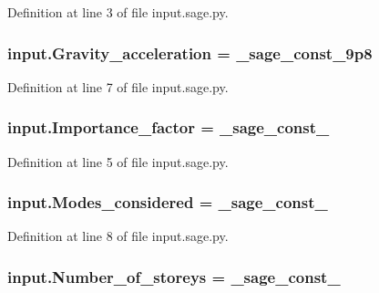Definition at line 3 of file input.\+sage.\+py.

\hypertarget{a00038_a55ab15c1c171513e99332aa50c723764}{}
\subsubsection[{Gravity\+\_\+acceleration}]{\setlength{\rightskip}{0pt plus 5cm}input.\+Gravity\+\_\+acceleration = {\bf \+\_\+sage\+\_\+const\+\_\+9p8}}\label{a00038_a55ab15c1c171513e99332aa50c723764}


Definition at line 7 of file input.\+sage.\+py.

\hypertarget{a00038_a0840d963ea24db338f3ab4457defb494}{}
\subsubsection[{Importance\+\_\+factor}]{\setlength{\rightskip}{0pt plus 5cm}input.\+Importance\+\_\+factor = \+\_\+sage\+\_\+const\+\_}\label{a00038_a0840d963ea24db338f3ab4457defb494}


Definition at line 5 of file input.\+sage.\+py.

\hypertarget{a00038_adb7aca4735796aaa4a46456d3edeac2e}{}
\subsubsection[{Modes\+\_\+considered}]{\setlength{\rightskip}{0pt plus 5cm}input.\+Modes\+\_\+considered = \+\_\+sage\+\_\+const\+\_}\label{a00038_adb7aca4735796aaa4a46456d3edeac2e}


Definition at line 8 of file input.\+sage.\+py.

\hypertarget{a00038_a10237b312ba44e8c8090db86059c5803}{}
\subsubsection[{Number\+\_\+of\+\_\+storeys}]{\setlength{\rightskip}{0pt plus 5cm}input.\+Number\+\_\+of\+\_\+storeys = \+\_\+sage\+\_\+const\+\_}\label{a00038_a10237b312ba44e8c8090db86059c5803}


